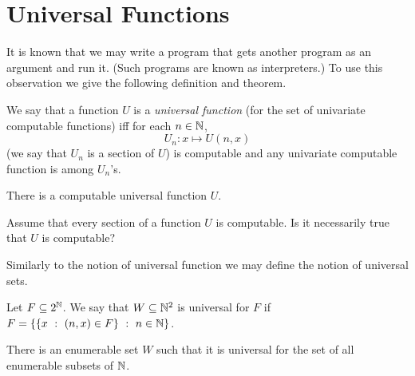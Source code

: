 \chapter{Universal Functions}
It is known that we may write a program that gets another program as an argument
and run it. (Such programs are known as interpreters.) To use this observation
we give the following definition and theorem.
\begin{definition}
  We say that a function $U$ is a \emph{universal function} (for the set of
  univariate computable functions) iff for each $n \in {\mathbb{N}}$,
  \[
    U_n : x \mapsto U(n, x)
  \]
  (we say that $U_n$ is a section of $U$)
  is computable and any univariate computable function is among $U_n$'s.
\end{definition}

\begin{theorem}
\label{theorem:universal-function-computable}
  There is a computable universal function $U$.
\end{theorem}

\begin{exercise}
  Assume that every section of a function $U$ is computable.
  Is it necessarily true that $U$ is computable?
\end{exercise}

Similarly to the notion of universal function we may define the notion
of universal sets.
\begin{definition}
  Let $F \subseteq 2^{\mathbb{N}}$. We say that $W \subseteq {\mathbb{N}}^2$ is universal for $F$
  if $F = \set[n \in \N]{\set[(n, x) \in F]{x}}$.
\end{definition}

\begin{theorem}
  There is an enumerable set $W$ such that it is universal for the set of
  all enumerable subsets of ${\mathbb{N}}$.
\end{theorem}

